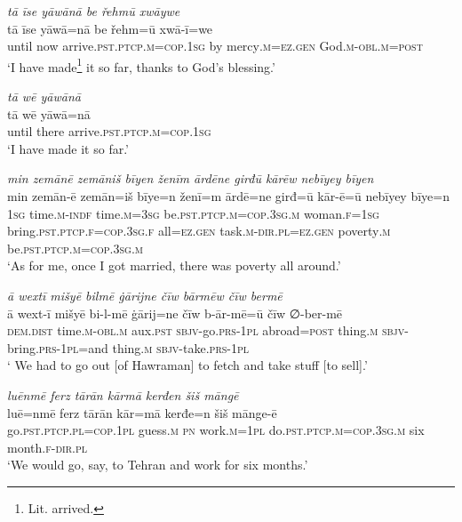 \ea \label{ŽM.17}
\textit{tā īse yāwānā be řehmū xwāywe} \\ 
\gll tā īse yāwā=nā be řehm=ū xwā-ī=we \\ 
 until now arrive\textsc{.pst}\textsc{.ptcp}\textsc{.m}\textsc{=cop}\textsc{.\textsc{1sg}} by mercy\textsc{.m}\textsc{=ez.gen} God\textsc{.m}\textsc{-obl}\textsc{.m}\textsc{=\textsc{post}} \\ 
\glt `I have made\footnote{Lit. arrived.} it so far, thanks to God's blessing.'
\z 
 
\ea \label{ŽM.18}
\textit{tā wē yāwānā} \\ 
\gll tā wē yāwā=nā \\ 
 until there arrive\textsc{.pst}\textsc{.ptcp}\textsc{.m}\textsc{=cop}\textsc{.\textsc{1sg}} \\ 
\glt `I have made it so far.'
\z 
 
\ea \label{ŽM.20}
\textit{min zemānē zemāniš bīyen ženīm ārdēne girđū kārēw nebīyey bīyen} \\ 
\gll min zemān-ē zemān=iš bīye=n ženī=m ārdē=ne girđ=ū kār-ē=ū nebīyey bīye=n \\ 
 \textsc{1sg} time\textsc{.m}\textsc{-indf} time\textsc{.m}\textsc{=3sg} be\textsc{.pst}\textsc{.ptcp}\textsc{.m}\textsc{=cop}\textsc{.3sg}\textsc{.m} woman\textsc{.f}\textsc{=\textsc{1sg}} bring\textsc{.pst}\textsc{.ptcp}\textsc{.f}\textsc{=cop}\textsc{.3sg}\textsc{.f} all\textsc{=ez.gen} task\textsc{.m}\textsc{-dir}\textsc{.pl}\textsc{=ez.gen} poverty\textsc{.m} be\textsc{.pst}\textsc{.ptcp}\textsc{.m}\textsc{=cop}\textsc{.3sg}\textsc{.m} \\ 
\glt `As for me, once I got married, there was poverty all around.'
\z 
 
\ea \label{ŽM.22}
\textit{ā wextī mišyē bilmē ġārijne čīw bārmēw čīw bermē} \\ 
\gll ā wext-ī mišyē bi-l-mē ġārij=ne čīw b-ār-mē=ū čīw ∅-ber-mē \\ 
 \textsc{dem.dist} time\textsc{.m}\textsc{-obl}\textsc{.m} aux\textsc{.pst} \textsc{sbjv-}go\textsc{.prs}\textsc{-\textsc{1pl}} abroad\textsc{=\textsc{post}} thing\textsc{.m} \textsc{sbjv-}bring\textsc{.prs}\textsc{-\textsc{1pl}}=and thing\textsc{.m} \textsc{sbjv-}take\textsc{.prs}\textsc{-\textsc{1pl}} \\ 
\glt ` We had to go out [of Hawraman] to fetch and take stuff [to sell].'
\z 
 
\ea \label{ŽM.23}
\textit{luēnmē ferz tārān kārmā kerđen šiš māngē} \\ 
\gll luē=nmē ferz tārān kār=mā kerđe=n šiš mānge-ē \\ 
 go\textsc{.pst}\textsc{.ptcp}\textsc{.pl}\textsc{=cop}\textsc{.\textsc{1pl}} guess\textsc{.m} \textsc{pn} work\textsc{.m}\textsc{=\textsc{1pl}} do\textsc{.pst}\textsc{.ptcp}\textsc{.m}\textsc{=cop}\textsc{.3sg}\textsc{.m} six month\textsc{.f}\textsc{-dir}\textsc{.pl} \\ 
\glt `We would go, say, to Tehran and work for six months.'
\z 
 
